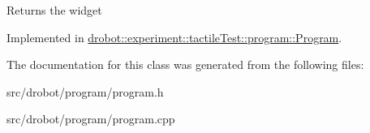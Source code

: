 \begin{DoxyReturn}{Returns}
the widget 
\end{DoxyReturn}


Implemented in \hyperlink{classdrobot_1_1experiment_1_1tactileTest_1_1program_1_1Program_a63c70e8e24bfc651d3be41680590303d}{drobot\-::experiment\-::tactile\-Test\-::program\-::\-Program}.



The documentation for this class was generated from the following files\-:\begin{DoxyCompactItemize}
\item 
src/drobot/program/program.\-h\item 
src/drobot/program/program.\-cpp\end{DoxyCompactItemize}
